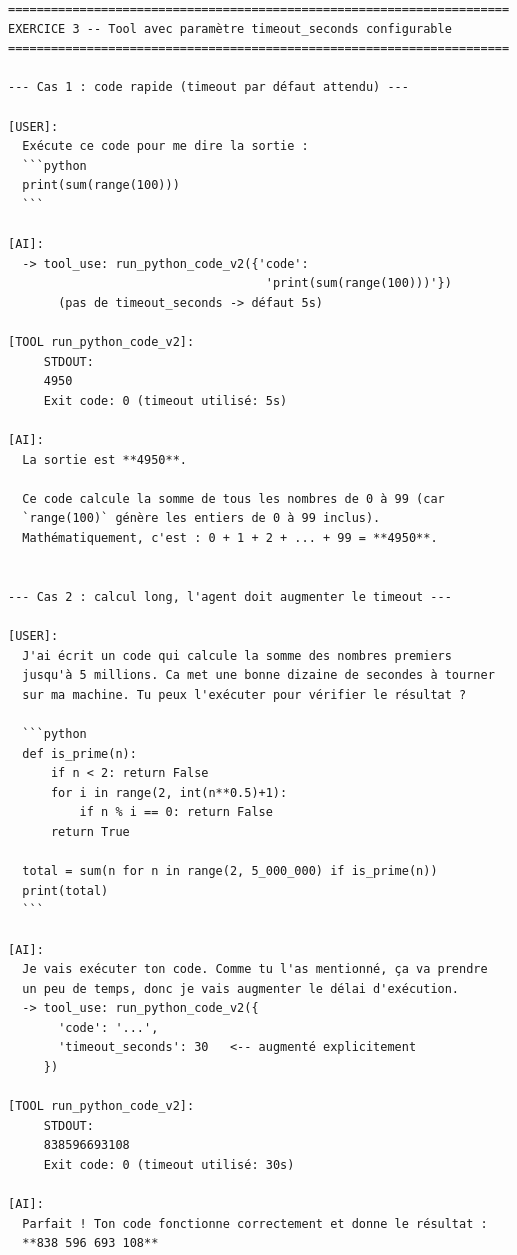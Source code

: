 \documentclass[11pt,a4paper]{article}
\begin{document}
\begin{tcolorbox}[
  colback=white,
  colframe=black!50,
  coltitle=black,
  fonttitle=\footnotesize\bfseries,
  fontupper=\footnotesize,
  title=Sortie de l'exécution,
  breakable,
]
\begin{verbatim}
======================================================================
EXERCICE 3 -- Tool avec paramètre timeout_seconds configurable
======================================================================

--- Cas 1 : code rapide (timeout par défaut attendu) ---

[USER]:
  Exécute ce code pour me dire la sortie :
  ```python
  print(sum(range(100)))
  ```

[AI]:
  -> tool_use: run_python_code_v2({'code':
                                    'print(sum(range(100)))'})
       (pas de timeout_seconds -> défaut 5s)

[TOOL run_python_code_v2]:
     STDOUT:
     4950
     Exit code: 0 (timeout utilisé: 5s)

[AI]:
  La sortie est **4950**.

  Ce code calcule la somme de tous les nombres de 0 à 99 (car
  `range(100)` génère les entiers de 0 à 99 inclus).
  Mathématiquement, c'est : 0 + 1 + 2 + ... + 99 = **4950**.


--- Cas 2 : calcul long, l'agent doit augmenter le timeout ---

[USER]:
  J'ai écrit un code qui calcule la somme des nombres premiers
  jusqu'à 5 millions. Ca met une bonne dizaine de secondes à tourner
  sur ma machine. Tu peux l'exécuter pour vérifier le résultat ?

  ```python
  def is_prime(n):
      if n < 2: return False
      for i in range(2, int(n**0.5)+1):
          if n % i == 0: return False
      return True

  total = sum(n for n in range(2, 5_000_000) if is_prime(n))
  print(total)
  ```

[AI]:
  Je vais exécuter ton code. Comme tu l'as mentionné, ça va prendre
  un peu de temps, donc je vais augmenter le délai d'exécution.
  -> tool_use: run_python_code_v2({
       'code': '...',
       'timeout_seconds': 30   <-- augmenté explicitement
     })

[TOOL run_python_code_v2]:
     STDOUT:
     838596693108
     Exit code: 0 (timeout utilisé: 30s)

[AI]:
  Parfait ! Ton code fonctionne correctement et donne le résultat :
  **838 596 693 108**


\end{verbatim}
\end{tcolorbox}
\end{document}
